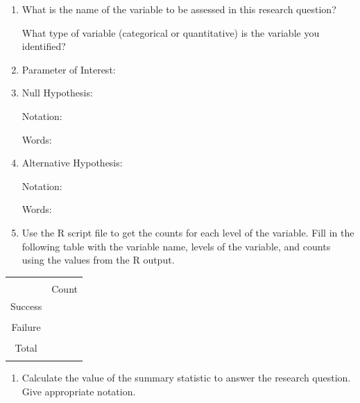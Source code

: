 \documentclass[
]{report}
\providecommand{\tightlist}{%
  \setlength{\itemsep}{0pt}\setlength{\parskip}{0pt}}
\begin{document}
\begin{enumerate}
\def\labelenumi{\alph{enumi}.}
\item
  What is the name of the variable to be assessed in this research question?
  \vspace{0.5in}

  What type of variable (categorical or quantitative) is the variable you identified?
  \vspace{0.3in}
\item
  Parameter of Interest:
  \vspace{0.5in}
\item
  Null Hypothesis:

  Notation:
  \vspace{0.3in}

  Words:
  \vspace{0.5in}
\item
  Alternative Hypothesis:

  Notation:
  \vspace{0.3in}

  Words:
  \vspace{0.5in}
\item
  Use the R script file to get the counts for each level of the variable. Fill in the following table with the variable name, levels of the variable, and counts using the values from the R output.
\end{enumerate}

\begingroup
\setlength{\tabcolsep}{14pt}
\renewcommand{\arraystretch}{2}
\begin{center}
\begin{tabular}{|c|p{1in}|}
\hline
 &  \\
 & Count \\ \hline
 Success & \\
 & \\ \hline
 Failure & \\
 & \\ \hline
 Total & \\
 & \\ \hline
\end{tabular}
\end{center}
\endgroup

\begin{enumerate}
\def\labelenumi{\alph{enumi}.}
\setcounter{enumi}{5}
\tightlist
\item
  Calculate the value of the summary statistic to answer the research question. Give appropriate notation.
\end{enumerate}
\end{document}
